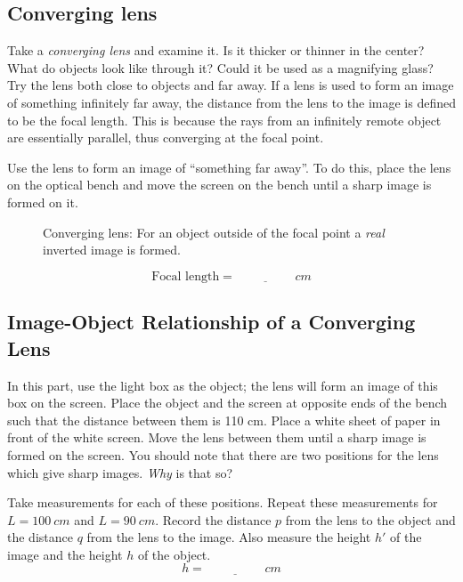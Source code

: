 \documentclass[11pt, a4paper]{article}
\begin{document}
\subsection{Converging lens}
Take a \textit{converging lens} and examine it.
Is it thicker or thinner in the center?
What do objects look like through it?
Could it be used as a magnifying glass?
Try the lens both close to objects and far away.
\fillwithlines{3cm}
If a lens is used to form an image of something infinitely far away, the
distance from the lens to the image is defined to be the focal length. 
This is because the rays from an infinitely remote object are essentially
parallel, thus converging at the focal point.

Use the lens to form an image of “something far away”. 
To do this, place the lens on the optical bench and move the screen on the
bench until a sharp image is formed on it. 
\begin{figure}[tbh]
    \centering
    \def\svgwidth{0.7\textwidth}
    
    \caption{Converging lens: For an object outside of the focal point a \textit{real}
    inverted image is formed.}
    \label{fig:convLens}
\end{figure}
\begin{equation*}
    \text{Focal length} = \underline{\hspace{2cm}}\si{cm}
\end{equation*}

\subsection{Image-Object Relationship of a Converging Lens}
In this part, use the light box as the object; the lens will form an image of
this box on the screen.
Place the object and the screen at opposite ends of the bench such that the
distance between them is 110 cm.
Place a white sheet of paper in front of the white screen. 
Move the lens between them until a sharp image is formed on the screen.
You should note that there are two positions for the lens which give sharp
images. \textit{Why} is that so?
\fillwithlines{3cm}

Take measurements for each of these positions.
Repeat these measurements for $L = 100~\si{cm}$ and $L = 90~\si{cm}$.
Record the distance $p$ from the lens to the object and the distance
$q$ from the lens to the image.
Also measure the height $h'$ of the image and the height $h$
of the object.
\begin{equation*}
    h = \underline{\hspace{2cm}}\si{cm}
\end{equation*}
\end{document}
